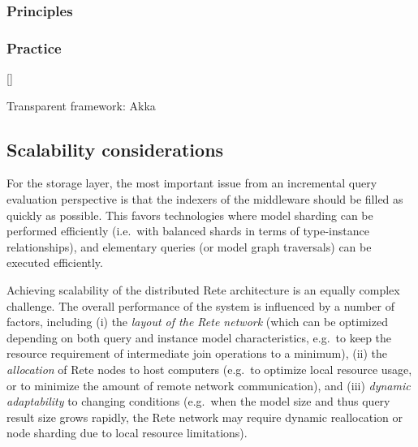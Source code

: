 \subsubsection{Principles}


\subsubsection{Practice}

\autoref{}

Transparent framework: Akka







\subsection{Scalability considerations}
For the storage layer, the most important issue from an incremental query evaluation perspective is that the indexers of the middleware should be filled as quickly as possible. This favors technologies where model sharding can be performed efficiently (i.e.\ with balanced shards in terms of type-instance relationships), and elementary queries (or model graph traversals) can be executed efficiently.

Achieving scalability of the distributed Rete architecture is an equally complex challenge. The overall performance of the system is influenced by a number of factors, including (i) the \emph{layout of the Rete network} (which can be optimized depending on both query and instance model characteristics, e.g.\ to keep the resource requirement of intermediate join operations to a minimum), (ii) the \emph{allocation} of Rete nodes to host computers (e.g.\ to optimize local resource usage, or to minimize the amount of remote network communication), and (iii) \emph{dynamic adaptability} to changing conditions (e.g.\ when the model size and thus query result size grows rapidly, the Rete network may require dynamic reallocation or node sharding due to local resource limitations).

